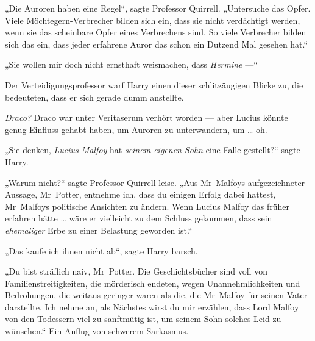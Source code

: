 „Die Auroren haben eine Regel“, sagte Professor Quirrell.
„Untersuche das Opfer. Viele Möchtegern-Verbrecher bilden sich ein, dass sie nicht verdächtigt werden, wenn sie das scheinbare Opfer eines Verbrechens sind. So viele Verbrecher bilden sich das ein, dass jeder erfahrene Auror das schon ein Dutzend Mal gesehen hat.“

„Sie wollen mir doch nicht ernsthaft weismachen, dass \emph{Hermine} —“

Der Verteidigungsprofessor warf Harry einen dieser schlitzäugigen Blicke zu, die bedeuteten, dass er sich gerade dumm anstellte.

\emph{Draco?} Draco war unter Veritaserum verhört worden — aber Lucius könnte genug Einfluss gehabt haben, um Auroren zu unterwandern, um … oh.

„Sie denken, \emph{Lucius Malfoy} hat \emph{seinem eigenen Sohn} eine Falle gestellt?“ sagte Harry.

„Warum nicht?“ sagte Professor Quirrell leise.
„Aus Mr~Malfoys aufgezeichneter Aussage, Mr~Potter, entnehme ich, dass du einigen Erfolg dabei hattest, Mr~Malfoys politische Ansichten zu ändern. Wenn Lucius Malfoy das früher erfahren hätte … wäre er vielleicht zu dem Schluss gekommen, dass sein \emph{ehemaliger} Erbe zu einer Belastung geworden ist.“

„Das kaufe ich ihnen nicht ab“, sagte Harry barsch.

„Du bist sträflich naiv, Mr~Potter. Die Geschichtsbücher sind voll von Familienstreitigkeiten, die mörderisch endeten, wegen Unannehmlichkeiten und Bedrohungen, die weitaus geringer waren als die, die Mr~Malfoy für seinen Vater darstellte. Ich nehme an, als Nächstes wirst du mir erzählen, dass Lord Malfoy von den Todessern viel zu sanftmütig ist, um seinem Sohn solches Leid zu wünschen.“ Ein Anflug von schwerem Sarkasmus.

